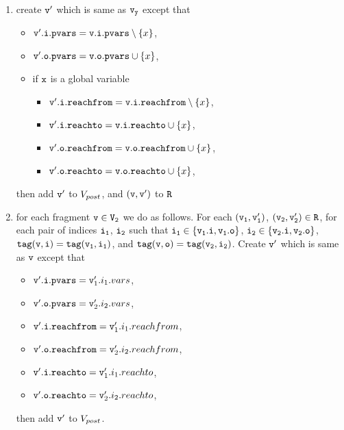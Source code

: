 \begin{itemize}
\begin{enumerate}
\item create $\tt v'$ which is same as $\tt \mathtt{v}_y$ except that
\begin{itemize}
\item $\mathtt{v}'.\mathtt{i}.\mathtt{pvars} = \mathtt{v}.\mathtt{i}.\mathtt{pvars} \setminus \left\{x\right\}$,
\item $\mathtt{v}'.\mathtt{o}.\mathtt{pvars} = \mathtt{v}.\mathtt{o}.\mathtt{pvars} \cup \left\{x\right\}$,
\item if $\tt x$ is a global variable
\begin{itemize}
\item $\mathtt{v}'.\mathtt{i}.\mathtt{reachfrom} = \mathtt{v}.\mathtt{i}.\mathtt{reachfrom} \setminus \left\{x\right\}$,
\item $\mathtt{v}'.\mathtt{i}.\mathtt{reachto} = \mathtt{v}.\mathtt{i}.\mathtt{reachto} \cup \left\{x\right\}$,
 \item $\mathtt{v}'.\mathtt{o}.\mathtt{reachfrom} = \mathtt{v}.\mathtt{o}.\mathtt{reachfrom} \cup \left\{x\right\}$,
 \item $\mathtt{v}'.\mathtt{o}.\mathtt{reachto} = \mathtt{v}.\mathtt{o}.\mathtt{reachto} \cup \left\{x\right\}$,
\end{itemize}
\end{itemize}
then add $\tt v'$ to $V_{post}$, and $\tt (v,v')$ to $\tt R$
%

\item for each fragment $\tt v \in V_2$ we do as follows. For each $\tt (\mathtt{v}_1,\mathtt{v}_1')$, $\tt (\mathtt{v}_2,\mathtt{v}_2') \in R$, for each pair of indices $\tt i_1$, $\tt i_2$ such that $\tt i_1 \in \{\mathtt{v}_1.i, \mathtt{v}_1.o\}$, $\tt i_2 \in \{\mathtt{v}_2.i, \mathtt{v}_2.o\}$, $\tt tag(v,i) = tag(\mathtt{v}_1, i_1)$, and $\tt tag(v,o) = tag(\mathtt{v}_2, i_2)$. Create $\tt v'$ which is same as $\tt v$ except that 
\begin{itemize}
\item $\mathtt{v}'.\mathtt{i}.\mathtt{pvars} = \mathtt{v}_1'.i_1.vars$,
\item $\mathtt{v}'.\mathtt{o}.\mathtt{pvars} = \mathtt{v}_2'.i_2.vars$,

\item $\mathtt{v}'.\mathtt{i}.\mathtt{reachfrom} = \mathtt{v}_1'.i_1.reachfrom$,
\item $\mathtt{v}'.\mathtt{o}.\mathtt{reachfrom} = \mathtt{v}_2'.i_2.reachfrom$,
\item $\mathtt{v}'.\mathtt{i}.\mathtt{reachto} = \mathtt{v}_1'.i_1.reachto$,
\item $\mathtt{v}'.\mathtt{o}.\mathtt{reachto} = \mathtt{v}_2'.i_2.reachto$,
\end{itemize} then add $\tt v'$ to $V_{post}$. 
\end{enumerate}	





\end{itemize}
